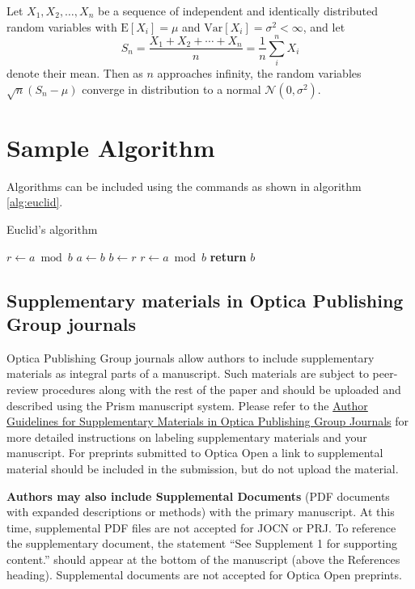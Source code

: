 \documentclass[9pt,twocolumn,twoside]{opticajnl}
\begin{document}
Let $X_1, X_2, \ldots, X_n$ be a sequence of independent and identically distributed random variables with $\text{E}[X_i] = \mu$ and $\text{Var}[X_i] = \sigma^2 < \infty$, and let
\begin{equation}
S_n = \frac{X_1 + X_2 + \cdots + X_n}{n}
      = \frac{1}{n}\sum_{i}^{n} X_i
\label{eq:refname1}
\end{equation}
denote their mean. Then as $n$ approaches infinity, the random variables $\sqrt{n}(S_n - \mu)$ converge in distribution to a normal $\mathcal{N}(0, \sigma^2)$.

\section{Sample Algorithm}

Algorithms can be included using the commands as shown in algorithm \ref{alg:euclid}.

\begin{algorithm}
\caption{Euclid’s algorithm}\label{alg:euclid}
\begin{algorithmic}[1]
\State $r\gets a\bmod b$
\State $a\gets b$
\State $b\gets r$
\State $r\gets a\bmod b$
\EndWhile\label{euclidendwhile}
\State \textbf{return} $b$
\EndProcedure
\end{algorithmic}
\end{algorithm}

\subsection{Supplementary materials in Optica Publishing Group journals}
Optica Publishing Group journals allow authors to include supplementary materials as integral parts of a manuscript. Such materials are subject to peer-review procedures along with the rest of the paper and should be uploaded and described using the Prism manuscript system. Please refer to the \href{https://opg.optica.org/submit/style/supplementary_materials.cfm}{Author Guidelines for Supplementary Materials in Optica Publishing Group Journals} for more detailed instructions on labeling supplementary materials and your manuscript. For preprints submitted to Optica Open a link to supplemental material should be included in the submission, but do not upload the material.

\textbf{Authors may also include Supplemental Documents} (PDF documents with expanded descriptions or methods) with the primary manuscript. At this time, supplemental PDF files are not accepted for JOCN or PRJ. To reference the supplementary document, the statement ``See Supplement 1 for supporting content.'' should appear at the bottom of the manuscript (above the References heading). Supplemental documents are not accepted for Optica Open preprints.
\end{document}
